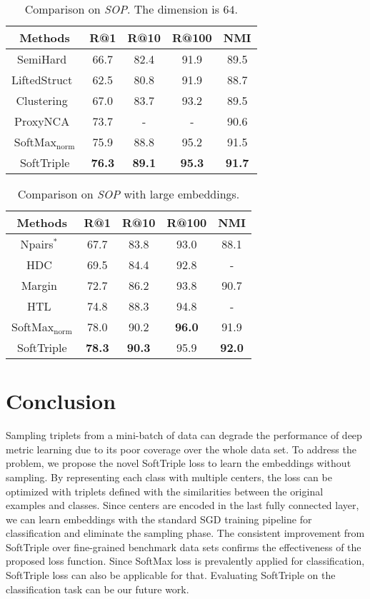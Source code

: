 \documentclass[10pt,twocolumn,letterpaper]{article}
\begin{document}
\begin{table}[!ht]
\centering
\small
\caption{Comparison on \textit{SOP}. The dimension is $64$.}\label{ta:sop64}
\begin{tabular}{c|cccc}
Methods&R@1&R@10&R@100&NMI\\\hline
SemiHard~\cite{SchroffKP15}&66.7&82.4&91.9&89.5\\
LiftedStruct~\cite{SongXJS16}&62.5&80.8&91.9&88.7\\
Clustering~\cite{SongJR017}&67.0&83.7&93.2&89.5\\
ProxyNCA~\cite{Attias17}&73.7&-&-&90.6\\\hline
SoftMax$_{\mathrm{norm}}$&75.9&88.8&95.2&91.5\\
SoftTriple&\textbf{76.3}&\textbf{89.1}&\textbf{95.3}&\textbf{91.7}\\
\end{tabular}
\end{table}

\begin{table}[!ht]
\centering
\small
\caption{Comparison on \textit{SOP} with large embeddings.}\label{ta:sop512}
\begin{tabular}{c|cccc}
Methods&R@1&R@10&R@100&NMI\\\hline
Npairs$^*$~\cite{Sohn16}&67.7&83.8&93.0&88.1\\
HDC~\cite{YuanYZ17}&69.5&84.4&92.8&-\\
Margin~\cite{ManmathaWSK17}&72.7&86.2&93.8&90.7\\
HTL~\cite{GeHDS18}&74.8&88.3&94.8&-\\\hline
SoftMax$_{\mathrm{norm}}$&78.0&90.2&\textbf{96.0}&91.9\\
SoftTriple&\textbf{78.3}&\textbf{90.3}&95.9&\textbf{92.0}\\
\end{tabular}
\end{table}


\section{Conclusion}
\label{sec:conclud}
Sampling triplets from a mini-batch of data can degrade the performance of deep metric learning due to its poor coverage over the whole data set. To address the problem, we propose the novel SoftTriple loss to learn the embeddings without sampling. By representing each class with multiple centers, the loss can be optimized with triplets defined with the similarities between the original examples and classes. Since centers are encoded in the last fully connected layer, we can learn embeddings with the standard SGD training pipeline for classification and eliminate the sampling phase. The consistent improvement from SoftTriple over fine-grained benchmark data sets confirms the effectiveness of the proposed loss function. Since SoftMax loss is prevalently applied for classification, SoftTriple loss can also be applicable for that. Evaluating SoftTriple on the classification task can be our future work.



{\small


}
\end{document}
